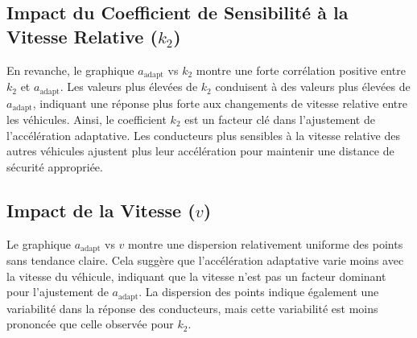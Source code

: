 \documentclass{article}
\begin{document}
\subsection{Impact du Coefficient de Sensibilité à la Vitesse Relative (\(k_2\))}

En revanche, le graphique \(a_{\text{adapt}} \) vs \( k_2 \) montre une forte corrélation positive entre \(k_2\) et \(a_{\text{adapt}}\). Les valeurs plus élevées de \(k_2\) conduisent à des valeurs plus élevées de \(a_{\text{adapt}}\), indiquant une réponse plus forte aux changements de vitesse relative entre les véhicules. Ainsi, le coefficient \(k_2\) est un facteur clé dans l'ajustement de l'accélération adaptative. Les conducteurs plus sensibles à la vitesse relative des autres véhicules ajustent plus leur accélération pour maintenir une distance de sécurité appropriée.

\subsection{Impact de la Vitesse (\(v\))}

Le graphique \(a_{\text{adapt}} \) vs \( v \) montre une dispersion relativement uniforme des points sans tendance claire. Cela suggère que l'accélération adaptative varie moins avec la vitesse du véhicule, indiquant que la vitesse n'est pas un facteur dominant pour l'ajustement de \(a_{\text{adapt}}\). La dispersion des points indique également une variabilité dans la réponse des conducteurs, mais cette variabilité est moins prononcée que celle observée pour \(k_2\).
\end{document}
